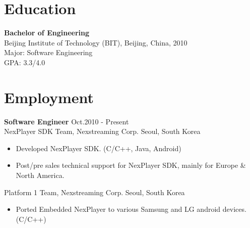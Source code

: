 \documentclass[margin]{res}
\begin{document}

\address{  Email: kimcherwoo@gmail.com\\Mobile: (+82)010-8301-0173 \\Work: (+82)02-2194-5187}
\address{  Nexstreaming Corporation \\  2nd Flr, Gwangseong Bldg, \\ 831-47Yeoksamdong Gangnam-gu \\Seoul, South Korea.\\Postcode: 135-080 }


\begin{resume}
 

\section{Education} {\bf Bachelor of Engineering  } \\
                Beijing Institute of Technology (BIT), Beijing, China,  2010 	\\
                Major: Software Engineering \\
                GPA: 3.3/4.0
 
\section{Employment} 
				{ \bf Software Engineer  } \hfill Oct.2010 - Present \\                
				NexPlayer SDK Team, Nexstreaming Corp. Seoul, South Korea
                \begin{itemize}  \itemsep -2pt %
                \item   Developed NexPlayer SDK. (C/C++, Java, Android)
				\item   Post/pre sales technical support for NexPlayer SDK, mainly for Europe \& North America.
                \end{itemize}
				
				Platform 1 Team, Nexstreaming Corp. Seoul, South Korea
				\begin{itemize}  \itemsep -2pt %
				\item Ported Embedded NexPlayer to various Samsung and LG android devices.(C/C++)
				\end{itemize}
				

\end{resume}
\end{document}
